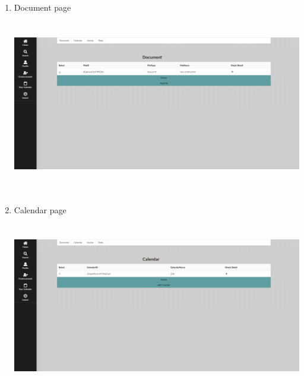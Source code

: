 \documentclass[onecolumn, draftclsnofoot,10pt, compsoc]{IEEEtran}
\begin{document}
\begin{enumerate}
\item Document page\newline\newline
\includegraphics[width=13cm, height=8cm]{web-document-page.png}\newline
\newpage
\item Calendar page\newline\newline
\includegraphics[width=13cm, height=8cm]{web-calendar-page.png}\newline


\end{enumerate}
\end{document}
